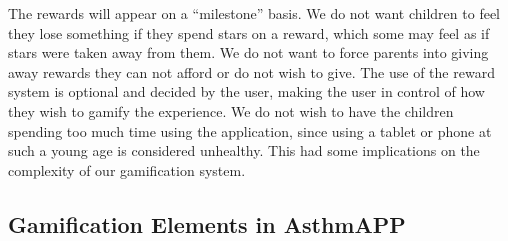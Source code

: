 The rewards will appear on a ``milestone'' basis. We do not want children to feel they lose something if they spend stars on a reward, which some may feel as if stars were taken away from them. We do not want to force parents into giving away rewards they can not afford or do not wish to give. The use of the reward system is optional and decided by the user, making the user in control of how they wish to gamify the experience. 
We do not wish to have the children spending too much time using the application, since using a tablet or phone at such a young age is considered unhealthy. This had some implications on the complexity of our gamification system. 


\subsection{Gamification Elements in AsthmAPP}
\label{sec:combininggamemechanismsinasthmapp}

